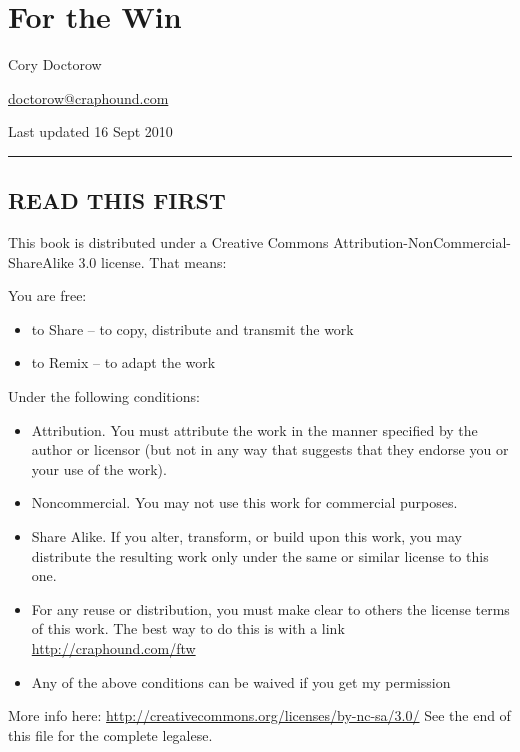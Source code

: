 \section{For the Win}

Cory Doctorow

\href{mailto:doctorow@craphound.com}{doctorow@craphound.com}

Last updated 16 Sept 2010

\begin{center}\rule{3in}{0.4pt}\end{center}

\subsection{READ THIS FIRST}

This book is distributed under a Creative Commons
Attribution-NonCommercial-ShareAlike 3.0 license. That means:

You are free:

\begin{itemize}
\item 
  to Share -- to copy, distribute and transmit the work
\item 
  to Remix -- to adapt the work
\end{itemize}
Under the following conditions:
\begin{itemize}
\item 
  Attribution. You must attribute the work in the manner specified by
  the author or licensor (but not in any way that suggests that they
  endorse you or your use of the work).
\item 
  Noncommercial. You may not use this work for commercial purposes.
\item 
  Share Alike. If you alter, transform, or build upon this work, you
  may distribute the resulting work only under the same or similar
  license to this one.
\item 
  For any reuse or distribution, you must make clear to others the
  license terms of this work. The best way to do this is with a link
  \href{http://craphound.com/ftw}{http://craphound.com/ftw}
\item 
  Any of the above conditions can be waived if you get my permission
\end{itemize}
More info here:
\href{http://creativecommons.org/licenses/by-nc-sa/3.0/}{http://creativecommons.org/licenses/by-nc-sa/3.0/}
See the end of this file for the complete legalese.

